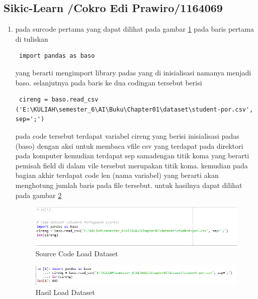 \subsection{Sikic-Learn /Cokro Edi Prawiro/1164069}
\begin{enumerate}
\item pada surcode pertama yang dapat dilihat pada gambar \ref{c19} pada baris pertama di tuliskan \begin{verbatim} import pandas as baso \end{verbatim} yang berarti mengimport library padas yang di inisialisasi namanya menjadi baso. selanjutnya pada baris ke dua codingan tersebut berisi \begin{verbatim} cireng = baso.read_csv
('E:\KULIAH\semester_6\AI\Buku\Chapter01\dataset\student-por.csv', sep=';')\end{verbatim} pada code tersebut terdapat variabel cireng yang berisi inisialisasi padas (baso) dengan aksi untuk membaca vfile csv yang terdapat pada direktori pada komputer kemudian terdapat sep samadengan titik koma yang berarti pemisah field di dalam vile tersebut merupakan titik koma. kemudian pada bagian akhir terdapat code len (nama variabel) yang berarti akan menghotung jumlah baris pada file tersebut. untuk hasilnya dapat dilihat pada gambar \ref{hasil1}

\begin{figure}[ht]
      \centerline{\includegraphics[width=1\textwidth]
      {figures/cokro/c19}}
      \caption{Source Code Load Dataset}
      \label{c19}
      \end{figure}

\begin{figure}[ht]
      \centerline{\includegraphics[width=1\textwidth]
      {figures/cokro/hasil1}}
      \caption{Hasil Load Dataset}
      \label{hasil1}
      \end{figure}


\end{enumerate}
